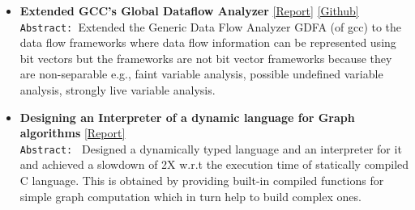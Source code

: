 \documentclass[9pt]{article}
\newenvironment{changemargin}[2]{%
  \begin{list}{}{%
    \setlength{\topsep}{0pt}%
    \setlength{\leftmargin}{#1}%
    \setlength{\rightmargin}{#2}%
    \setlength{\listparindent}{\parindent}%
    \setlength{\itemindent}{\parindent}%
    \setlength{\parsep}{\parskip}%
  }%
  \item[]}{\end{list}
}
\newenvironment{body} {
	\vspace*{-16pt}
	\begin{changemargin}{-0.25in}{-0.5in}
  }	
	{\end{changemargin}
}
\begin{document}
\begin{body}
\begin{itemize}
            \item \textbf{Extended GCC's Global Dataflow Analyzer} 
           \href{http://webhost.engr.illinois.edu/~sdasgup3/Document/report_gdfa.pdf}{[Report]} 
           \href{https://github.com/sdasgup3/non-separable-global-dataflow-framework}{[Github]} \\
                                \texttt{Abstract: }Extended the Generic Data Flow Analyzer
                                GDFA (of gcc) to the data flow frameworks where
                                data flow information can be represented using
                                bit vectors but the frameworks are not bit
                                vector frameworks because they are
                                non-separable e.g., faint variable analysis,
                                possible undefined variable analysis, strongly
                                live variable analysis.	

           \item \textbf{Designing an Interpreter of a dynamic language for Graph
algorithms}
           \href{http://webhost.engr.illinois.edu/~sdasgup3/Document/report_cs598dhp.pdf}{[Report]} \\
                                  \texttt{Abstract: } 
                                  Designed a dynamically typed language and an interpreter for it and 
                                  achieved a slowdown of 2X w.r.t the execution time of statically compiled C
                                  language. This is obtained by providing built-in compiled functions 
                                  for simple graph computation which in turn help to build complex
                                  ones.


\end{itemize}
\end{body}
\end{document}
